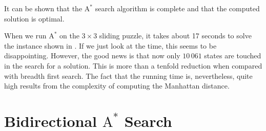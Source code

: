 It can be shown that the $\mathrm{A}^*$ search algorithm is complete and that the computed solution is optimal.

When we run $\mathrm{A}^*$ on the $3 \times 3$ sliding puzzle, it takes about 17 seconds to solve the instance
shown in .  If we just look at the time, this seems to be disappointing.  However, the good
news is that now only $10\,061$ states are touched in the search for a solution.  This is more than a tenfold
reduction when compared with breadth first search.  The fact that the running time
is, nevertheless, quite high results from the complexity of computing the Manhattan distance.



\section{Bidirectional $\mathrm{A}^*$ Search}
